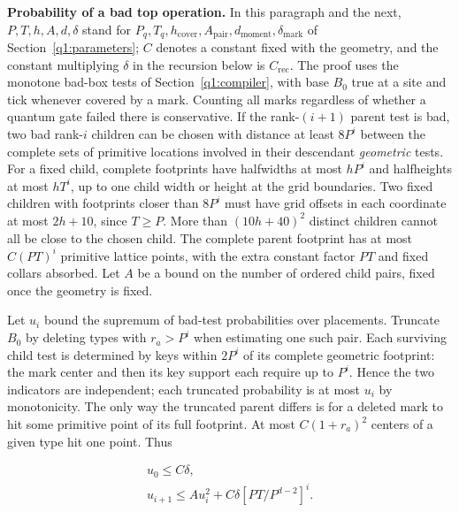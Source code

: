 \textbf{Probability of a bad top operation.} In this paragraph and the next, \(P,T,h,A,d,\delta\) stand for \(P_{q},T_{q},h_{\mathrm{cover}},A_{\mathrm{pair}},d_{\mathrm{moment}},\delta_{\mathrm{mark}}\) of Section~\ref{q1:parameters}; \(C\) denotes a constant fixed with the geometry, and the constant multiplying \(\delta\) in the recursion below is \(C_{\mathrm{rec}}\). The proof uses the monotone bad-box tests of Section~\ref{q1:compiler}, with base \(B_{0}\) true at a site and tick whenever covered by a mark. Counting all marks regardless of whether a quantum gate failed there is conservative. If the rank-\((i+1)\) parent test is bad, two bad rank-\(i\) children can be chosen with distance at least \(8P^{i}\) between the complete sets of primitive locations involved in their descendant \emph{geometric} tests. For a fixed child, complete footprints have halfwidths at most \(hP^{i}\) and halfheights at most \(hT^{i}\), up to one child width or height at the grid boundaries. Two fixed children with footprints closer than \(8P^{i}\) must have grid offsets in each coordinate at most \(2h+10\), since \(T\ge P\). More than \((10h+40)^{2}\) distinct children cannot all be close to the chosen child. The complete parent footprint has at most \(C(PT)^{i}\) primitive lattice points, with the extra constant factor \(PT\) and fixed collars absorbed. Let \(A\) be a bound on the number of ordered child pairs, fixed once the geometry is fixed.

Let \(u_{i}\) bound the supremum of bad-test probabilities over placements. Truncate \(B_{0}\) by deleting types with \(r_{a}>P^{i}\) when estimating one such pair. Each surviving child test is determined by keys within \(2P^{i}\) of its complete geometric footprint: the mark center and then its key support each require up to \(P^{i}\). Hence the two indicators are independent; each truncated probability is at most \(u_{i}\) by monotonicity. The only way the truncated parent differs is for a deleted mark to hit some primitive point of its full footprint. At most \(C(1+r_{a})^{2}\) centers of a given type hit one point. Thus

\[
\begin{gathered}
u_{0} \le  C \delta, \\ u_{i+1} \le  A u_{i}^{2} + C \delta [PT / P^{d-2}]^{i}.
\end{gathered}
\]

